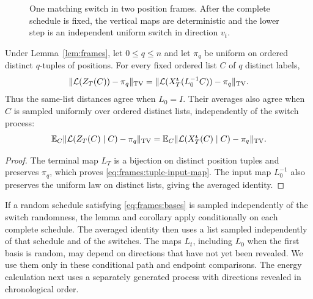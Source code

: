 \begin{figure}[b]
 \centering
 \caption{One matching switch in two position frames. After the
 complete schedule is fixed, the vertical maps are deterministic
 and the lower step is an independent uniform switch in direction
 $v_t$.}
 \label{fig:frames}
\end{figure}

\begin{corollary}
\label{cor:frames:marginals}
Under Lemma~\ref{lem:frames}, let $0\le q\le n$ and let $\pi_q$ be uniform on ordered
distinct $q$-tuples of positions. For every fixed ordered list $C$
of $q$ distinct labels,
\begin{equation}\label{eq:frames:tuple-input-map}
 \|\mathcal L(Z_T(C))-\pi_q\|_{\mathrm{TV}}
 =
 \|\mathcal L(X^{\boldsymbol\iota}_T(L_0^{-1}C))-\pi_q\|_{\mathrm{TV}}.
\end{equation}
Thus the same-list distances agree when $L_0=I$. Their averages
also agree when $C$ is sampled uniformly over ordered distinct lists,
independently of the switch process:
\begin{equation}\label{eq:frames:averaged-input-map}
 \mathbb E_C\|\mathcal L(Z_T(C)\mid C)-\pi_q\|_{\mathrm{TV}}
 =
 \mathbb E_C\|\mathcal L(X^{\boldsymbol\iota}_T(C)\mid C)-\pi_q\|_{\mathrm{TV}}.
\end{equation}
\end{corollary}
\begin{proof}
The terminal map $L_T$ is a bijection on distinct position tuples
and preserves $\pi_q$, which proves
\eqref{eq:frames:tuple-input-map}. The input map $L_0^{-1}$ also
preserves the uniform law on distinct lists, giving the averaged
identity.
\end{proof}

\begin{remark}
\label{rem:frames:conditioning}
If a random schedule satisfying \eqref{eq:frames:bases} is sampled
independently of the switch randomness, the lemma and corollary
apply conditionally on each complete schedule. The averaged
identity then uses a list sampled independently of that schedule
and of the switches. The maps $L_t$, including $L_0$ when the first
basis is random, may depend on directions that have not yet been
revealed. We use them only in these conditional path and endpoint
comparisons. The energy calculation next uses a separately
generated process with directions revealed in chronological order.
\end{remark}
